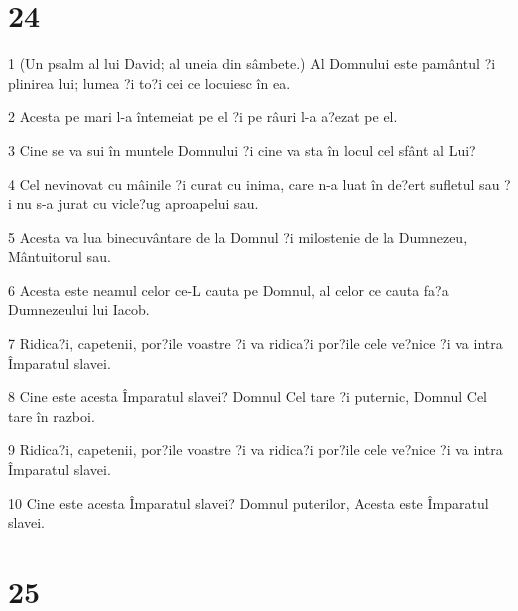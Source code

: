 \chapter{24}

\par 1 (Un psalm al lui David; al uneia din sâmbete.) Al Domnului este pamântul ?i plinirea lui; lumea ?i to?i cei ce locuiesc în ea.
\par 2 Acesta pe mari l-a întemeiat pe el ?i pe râuri l-a a?ezat pe el.
\par 3 Cine se va sui în muntele Domnului ?i cine va sta în locul cel sfânt al Lui?
\par 4 Cel nevinovat cu mâinile ?i curat cu inima, care n-a luat în de?ert sufletul sau ?i nu s-a jurat cu vicle?ug aproapelui sau.
\par 5 Acesta va lua binecuvântare de la Domnul ?i milostenie de la Dumnezeu, Mântuitorul sau.
\par 6 Acesta este neamul celor ce-L cauta pe Domnul, al celor ce cauta fa?a Dumnezeului lui Iacob.
\par 7 Ridica?i, capetenii, por?ile voastre ?i va ridica?i por?ile cele ve?nice ?i va intra Împaratul slavei.
\par 8 Cine este acesta Împaratul slavei? Domnul Cel tare ?i puternic, Domnul Cel tare în razboi.
\par 9 Ridica?i, capetenii, por?ile voastre ?i va ridica?i por?ile cele ve?nice ?i va intra Împaratul slavei.
\par 10 Cine este acesta Împaratul slavei? Domnul puterilor, Acesta este Împaratul slavei.

\chapter{25}

